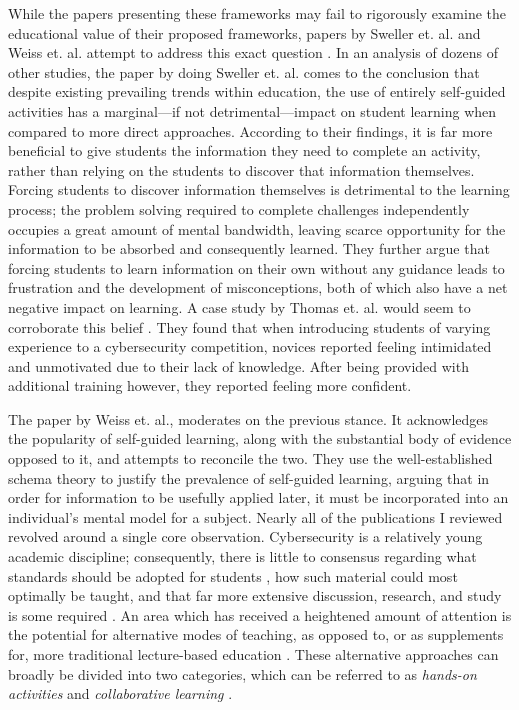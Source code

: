 \documentclass{article}
\begin{document}
    While the papers presenting these frameworks may fail to rigorously examine the educational value of their proposed frameworks, papers by Sweller et. al. and Weiss et. al. attempt to address this exact question \cite{J-Sweller,R-Weiss}. 
    In an analysis of dozens of other studies, the paper by doing Sweller et. al. comes to the conclusion that despite existing prevailing trends within education, the use of entirely self-guided activities has a marginal---if not detrimental---impact on student learning when compared to more direct approaches. 
    According to their findings, it is far more beneficial to give students the information they need to complete an activity, rather than relying on the students to discover that information themselves. 
    Forcing students to discover information themselves is detrimental to the learning process; 
    the problem solving required to complete challenges independently occupies a great amount of mental bandwidth, leaving scarce opportunity for the information to be absorbed and consequently learned. 
    They further argue that forcing students to learn information on their own without any guidance leads to frustration and the development of misconceptions, both of which also have a net negative impact on learning. 
    A case study by Thomas et. al. would seem to corroborate this belief \cite{L-Thomas}. 
    They found that when introducing students of varying experience to a cybersecurity competition, novices reported feeling intimidated and unmotivated due to their lack of knowledge. 
    After being provided with additional training however, they reported feeling more confident. 

    The paper by Weiss et. al., moderates on the previous stance. 
    It acknowledges the popularity of self-guided learning, along with the substantial body of evidence opposed to it, and attempts to reconcile the two. 
    They use the well-established schema theory to justify the prevalence of self-guided learning, arguing that in order for information to be usefully applied later, it must be incorporated into an individual’s mental model for a subject. 
    Nearly all of the publications I reviewed revolved around a single core observation. Cybersecurity is a relatively young academic discipline; consequently, there is little to consensus regarding what standards should be adopted for students \cite{R-Raj}, how such material could most optimally be taught, and that far more extensive discussion, research, and study is some required \cite{Z-Zeng}. An area which has received a heightened amount of attention is the potential for alternative modes of teaching, as opposed to, or as supplements for, more traditional lecture-based education \cite{Z-Zeng,N-Eliot,E-Gavas,C-Herr,K-Chung, C-Kussmaul,K-Leune,B-Payne,L-Thomas}. These alternative approaches can broadly be divided into two categories, which can be referred to as \emph{hands-on activities} and \emph{collaborative learning} \cite{P-Deshpande,C-Kussmaul,B-Payne}.
\end{document}
